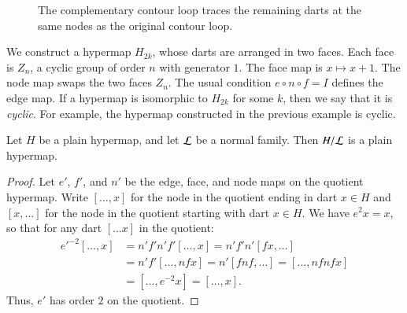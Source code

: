 \begin{figure}[htb]
  \centering
  \caption{The complementary contour loop traces the remaining darts
   at the same nodes as the original contour loop.}
  \label{fig:contour-comp}
\end{figure}


\begin{example}\label{ex:H2k} 
We 
construct a
hypermap $H_{2k}$, whose darts are arranged in two faces.  Each
face is $Z_n$, a cyclic group of order $n$ with generator $1$.
The face map is $x\mapsto x+1$.
The node map swaps the two faces $Z_n$.
The usual condition $e\circ n\circ f = I$ defines the edge map.
If a hypermap is isomorphic to $H_{2k}$ for
some $k$, then we say that it is {\it cyclic}.  For example,
the hypermap constructed in the previous example is cyclic.
\end{example}

\begin{lemma}
Let $H$ be a plain hypermap, and let $\cal L$ be a
normal family.  Then $H/{\cal L}$ is a plain hypermap.
\end{lemma}

\begin{proof} Let $e'$, $f'$, and $n'$ be the edge, face, and node maps on the
quotient hypermap.  Write $[\ldots, x]$ for the node in the quotient
ending in dart $x\in H$ and $[x,\ldots]$ for the node in the quotient
starting with dart $x\in H$.  We have $e^2 x = x$, so that for any
dart $[\ldots x]$ in the quotient:
    $$\begin{array}{lll}
    {e'}^{-2} [\ldots, x] &= n' f' n' f' [\ldots, x] = n' f' n' [f x, \ldots] \\&=
    n' f' [\ldots, n f x] = n' [f n f, \ldots] = [\ldots, n f n f x]\\ &=
    [\ldots, e^{-2} x] = [\ldots, x].
    \end{array}$$
Thus, $e'$ has order $2$ on the quotient.
\end{proof}

%


